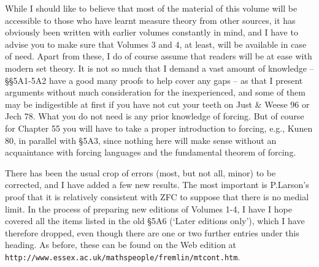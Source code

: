 While I should like to believe that most of the material of this volume 
will be accessible to those who have learnt measure theory from other 
sources, it has obviously been written with earlier volumes constantly in 
mind, and I have to advise you to make sure that Volumes 3 and 4, at 
least, will be available in case of need.   Apart from these, I do of 
course assume that readers will be at ease with modern set theory.   It is 
not so much that I demand a vast amount of knowledge -- \S\S5A1-5A2 have a 
good many proofs to help cover any gaps -- as that I present arguments 
without much consideration for the inexperienced, and some of them may be 
indigestible at first if you have not cut your teeth on  
{\smc Just \& Weese 96} or {\smc Jech 78}.   What you do not need is any 
prior knowledge of forcing.   But of course for Chapter 55 you will have to 
take a proper introduction to forcing, e.g., {\smc Kunen 80}, in parallel 
with \S5A3, since nothing here will make sense without an 
acquaintance with forcing languages and the fundamental theorem of forcing. 
 
\bigskip


There has been the usual crop of errors (most, but not all, minor) to be
corrected, and I have added a few new results.   The most important is
P.Larson's proof that it is relatively consistent with ZFC to suppose that
there is no medial limit.   %
In the process of preparing new editions of Volumes 1-4, I have I hope
covered all the items listed in the old \S5A6 
(`Later editions only'), which I have therefore dropped, even though
there are one or two further entries under this heading.   As before,
these can be found on the Web edition at
{\tt http://www.essex.ac.uk/maths{\bsp}people/fremlin/mtcont.htm}.    
